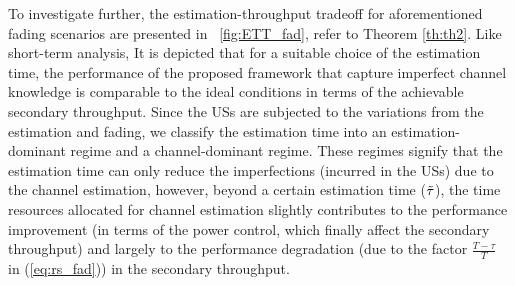 To investigate further, the estimation-throughput tradeoff for aforementioned fading scenarios are presented in \figurename~\ref{fig:ETT_fad}, refer to Theorem \ref{th:th2}. Like short-term analysis, It is depicted that for a suitable choice of the estimation time, the performance of the proposed framework that capture imperfect channel knowledge is comparable to the ideal conditions in terms of the achievable secondary throughput. Since the USs are subjected to the variations from the estimation and fading, we classify the estimation time into an estimation-dominant regime and a channel-dominant regime. These regimes signify that the estimation time can only reduce the imperfections (incurred in the USs) due to the channel estimation, however, beyond a certain estimation time ($\tilde{\tau}$), the time resources allocated for channel estimation slightly contributes to the performance improvement (in terms of the power control, which finally affect the secondary throughput) and largely to the performance degradation (due to the factor $\frac{T - \tau}{T}$ in (\ref{eq:rs_fad})) in the secondary throughput. 
\captionsetup[subfigure]{position=top}
